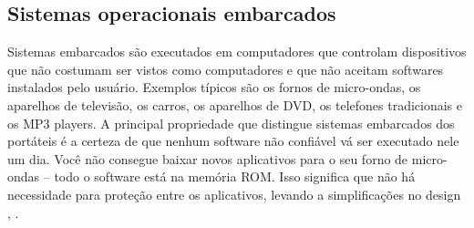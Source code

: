 \subsection{Sistemas operacionais embarcados}

Sistemas embarcados são executados em computadores que controlam dispositivos que não costumam ser vistos como computadores e que não aceitam softwares instalados pelo usuário. Exemplos típicos são os fornos de micro-ondas, os aparelhos de televisão, os carros, os aparelhos de DVD, os telefones tradicionais e os MP3 players. A principal propriedade que distingue sistemas embarcados dos portáteis é a certeza de que nenhum software não confiável vá ser executado nele um dia. Você não consegue baixar novos aplicativos para o seu forno de micro-ondas – todo o software está na memória ROM. Isso significa que não há necessidade para proteção entre os aplicativos, levando a simplificações no design \cite{Tanenbaum2016}, \cite{Comer2012}.\\ 

